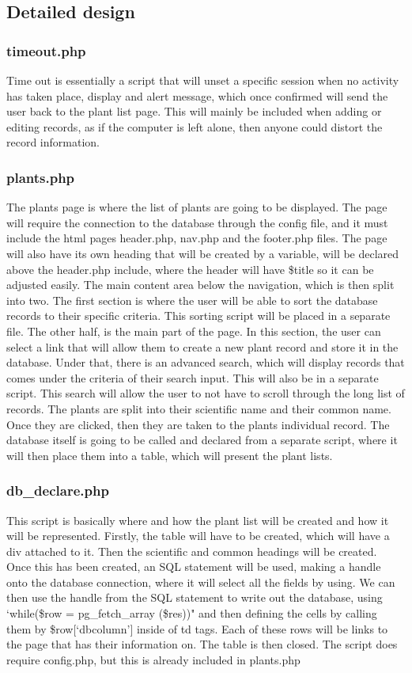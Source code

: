 \subsection{Detailed design}
	\subsubsection{timeout.php}
		Time out is essentially a script that will unset a specific session when no activity has taken place, display and alert message, which once confirmed will send the user back to the plant list page. This will mainly be included when adding or editing records, as if the computer is left alone, then anyone could distort the record information.

	\subsubsection{plants.php}
		The plants page is where the list of plants are going to be displayed. The page will require the connection to the database through the config file, and it must include the html pages header.php, nav.php and the footer.php files.  The page will also have its own heading that will be created by a variable, will be declared above the header.php include, where the header will have \$title so it can be adjusted easily. The main content area below the navigation, which is then split into two. The first section is where the user will be able to sort the database records to their specific criteria. This sorting script will be placed in a separate file. The other half, is the main part of the page. In this section, the user can select a link that will allow them to create a new plant record and store it in the database. Under that, there is an advanced search, which will display records that comes under the criteria of their search input. This will also be in a separate script. This search will allow the user to not have to scroll through the long list of records. The plants are split into their scientific name and their common name. Once they are clicked, then they are taken to the plants individual record. The database itself is going to be called and declared from a separate script, where it will then place them into a table, which will present the plant lists.

	\subsubsection{db\_declare.php}
		This script is basically where and how the plant list will be created and how it will be represented. Firstly, the table will have to be created, which will have a div attached to it. Then the scientific and common headings will be created. Once this has been created, an SQL statement will be used, making a handle onto the database connection, where it will select all the fields by using.  We can then use the handle from the SQL statement to write out the database, using `while(\$row = pg\_fetch\_array (\$res))" and then defining the cells by calling them by \$row[`dbcolumn'] inside of td tags.  Each of these rows will be links to the page that has their information on. The table is then closed. The script does require config.php, but this is already included in plants.php

